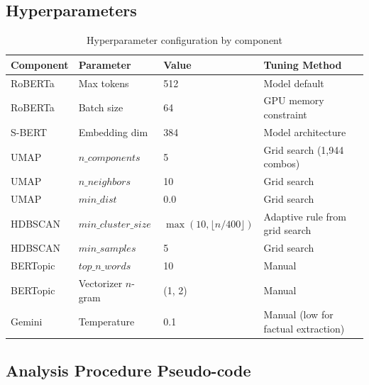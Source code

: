 \documentclass[12pt, letterpaper]{article}
\begin{document}
\subsection{Hyperparameters}

\begin{table}[H]
  \centering
  \caption{Hyperparameter configuration by component}
  \label{tab:hyperparams}
  \begin{tabular}{llll}
    \toprule
    \textbf{Component} & \textbf{Parameter} & \textbf{Value} & \textbf{Tuning Method} \\
    \midrule
    RoBERTa       & Max tokens           & 512        & Model default \\
    RoBERTa       & Batch size           & 64         & GPU memory constraint \\
    S-BERT        & Embedding dim        & 384        & Model architecture \\
    UMAP          & $n\_components$      & 5          & Grid search (1,944 combos) \\
    UMAP          & $n\_neighbors$       & 10         & Grid search \\
    UMAP          & $min\_dist$          & 0.0        & Grid search \\
    HDBSCAN       & $min\_cluster\_size$ & $\max(10, \lfloor n/400 \rfloor)$ & Adaptive rule from grid search \\
    HDBSCAN       & $min\_samples$       & 5          & Grid search \\
    BERTopic      & $top\_n\_words$      & 10         & Manual \\
    BERTopic      & Vectorizer $n$-gram  & (1, 2)     & Manual \\
    Gemini        & Temperature          & 0.1        & Manual (low for factual extraction) \\
    \bottomrule
  \end{tabular}
\end{table}

\subsection{Analysis Procedure Pseudo-code}
\end{document}
